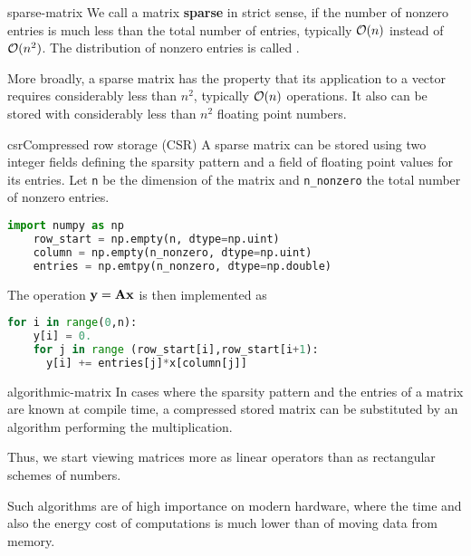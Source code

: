 \begin{Definition}{sparse-matrix}
  We call a matrix \textbf{sparse} in strict
  sense, if the number of nonzero entries is much less than the total
  number of entries, typically $\mathcal O(n)$ instead of $\mathcal O(n^2)$. The
  distribution of nonzero entries is called .

  More broadly, a sparse matrix has the property that its application
  to a vector requires considerably less than $n^2$, typically
  $\mathcal O(n)$ operations. It also can be stored with considerably less
  than $n^2$ floating point numbers.
\end{Definition}

\begin{Example*}{csr}{Compressed row storage (CSR)}
  A sparse matrix can be stored using two integer fields defining the
  sparsity pattern and a field of floating point values for its
  entries. Let \lstinline!n! be the dimension of the matrix and
  \lstinline!n_nonzero! the total number of nonzero entries.
  \begin{lstlisting}[language=Python]
    import numpy as np
    row_start = np.empty(n, dtype=np.uint)
    column = np.empty(n_nonzero, dtype=np.uint)
    entries = np.emtpy(n_nonzero, dtype=np.double)
  \end{lstlisting}

  The operation $\mathbf y=\mathbf A\mathbf x$ is then implemented as
  \begin{lstlisting}[language=Python]
    for i in range(0,n):
    y[i] = 0.
    for j in range (row_start[i],row_start[i+1):
      y[i] += entries[j]*x[column[j]]
  \end{lstlisting}  
\end{Example*}

\begin{Remark}{algorithmic-matrix}
  In cases where the sparsity pattern and the entries of a matrix are
  known at compile time, a compressed stored matrix can be substituted
  by an algorithm performing the multiplication.

  Thus, we start viewing matrices more as linear operators than as
  rectangular schemes of numbers.

  Such algorithms are of high importance on modern hardware, where the
  time and also the energy cost of computations is much lower than of
  moving data from memory.
\end{Remark}

